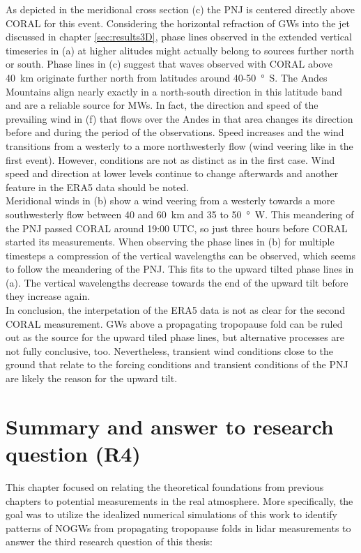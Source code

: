 As depicted in the meridional cross section (c) the PNJ is centered directly above CORAL for this event. Considering the horizontal refraction of GWs into the jet discussed in chapter \ref{sec:results3D}, phase lines observed in the extended vertical timeseries in (a) at higher alitudes might actually belong to sources further north or south. Phase lines in (c) suggest that waves observed with CORAL above \SI{40}{\kilo\meter} originate further north from latitudes around 40-\SI{50}{\degree S}. The Andes Mountains align nearly exactly in a north-south direction in this latitude band and are a reliable source for MWs. In fact, the direction and speed of the prevailing wind in (f) that flows over the Andes in that area changes its direction before and during the period of the observations. Speed increases and the wind transitions from a westerly to a more northwesterly flow (wind veering like in the first event). However, conditions are not as distinct as in the first case. Wind speed and direction at lower levels continue to change afterwards and another feature in the ERA5 data should be noted. \\
Meridional winds in (b) show a wind veering from a westerly towards a more southwesterly flow between 40 and \SI{60}{\kilo\meter} and 35 to \SI{50}{\degree W}. This meandering of the PNJ passed CORAL around 19:00 UTC, so just three hours before CORAL started its measurements. When observing the phase lines in (b) for multiple timesteps a compression of the vertical wavelengths can be observed, which seems to follow the meandering of the PNJ. This fits to the upward tilted phase lines in (a). The vertical wavelengths decrease towards the end of the upward tilt before they increase again. \\
In conclusion, the interpetation of the ERA5 data is not as clear for the second CORAL measurement. GWs above a propagating tropopause fold can be ruled out as the source for the upward tiled phase lines, but alternative processes are not fully conclusive, too. Nevertheless, transient wind conditions close to the ground that relate to the forcing conditions and transient conditions of the PNJ are likely the reason for the upward tilt.

\section{Summary and answer to research question (R4)}
\label{sec:lidOb-summary}
This chapter focused on relating the theoretical foundations from previous chapters to potential measurements in the real atmosphere. More specifically, the goal was to utilize the idealized numerical simulations of this work to identify patterns of NOGWs from propagating tropopause folds in lidar measurements to answer the third research question of this thesis:

